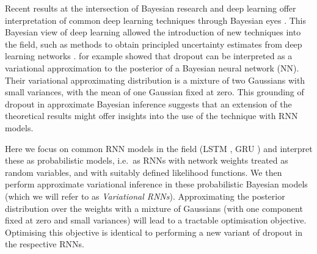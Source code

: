 \documentclass{article}
\theoremstyle{definition}
\begin{document}
Recent results at the intersection of Bayesian research and deep learning offer interpretation of common deep learning techniques through Bayesian eyes \citep{rezende2014stochastic,
blundell2015weight,
hernandez2015probabilistic,
Gal2015Bayesian,
Kingma2015,
Murphy2015}. This Bayesian view of deep learning allowed the introduction of new techniques into the field, such as methods to obtain principled uncertainty estimates from deep learning networks \citep{Gal2015Bayesian,Gal2015DropoutB}.
\citet{Gal2015Bayesian} for example showed that dropout can be interpreted as a variational approximation to the posterior of a Bayesian neural network (NN). Their variational approximating distribution is a mixture of two Gaussians with small variances, with the mean of one Gaussian fixed at zero.
This grounding of dropout in approximate Bayesian inference suggests that an extension of the theoretical results might offer insights into the use of the technique with RNN models.

Here we focus on common RNN models in the field (LSTM \citep{hochreiter1997long}, GRU \citep{cho2014Learning}) and interpret these as probabilistic models, i.e.\ as RNNs with network weights treated as random variables, and with suitably defined likelihood functions.
We then perform approximate variational inference in these probabilistic Bayesian models (which we will refer to as \textit{Variational RNNs}). Approximating the posterior distribution over the weights with a mixture of Gaussians (with one component fixed at zero and small variances) will lead to a tractable optimisation objective. 
Optimising this objective is identical to performing a new variant of dropout in the respective RNNs.
\end{document}
